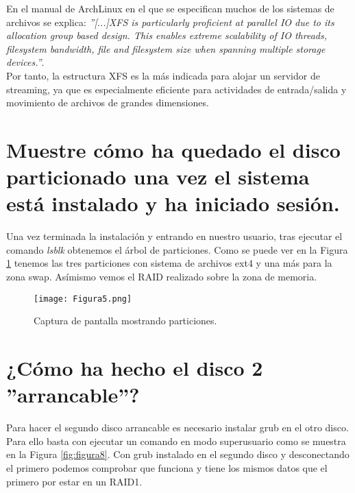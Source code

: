 En el manual de ArchLinux\cite{XFS} en el que se especifican muchos de los sistemas de archivos se explica: \textit{''[...]XFS is particularly proficient at parallel IO due to its allocation group based design. This enables extreme scalability of IO threads, filesystem bandwidth, file and filesystem size when spanning multiple storage devices.''}.\\
Por tanto, la estructura XFS es la más indicada para alojar un servidor de streaming\cite{streaming}, ya que es especialmente eficiente para actividades de entrada/salida y movimiento de archivos 
de grandes dimensiones.




\section{Muestre cómo ha quedado el disco particionado una vez el sistema está instalado y ha iniciado sesión.}

Una vez terminada la instalación y entrando en nuestro usuario, tras ejecutar el comando \textit{lsblk} obtenemos el árbol de particiones. Como se puede 
ver en la Figura \ref{fig:figura5} tenemos las tres particiones con sistema de archivos ext4 y una más para la zona swap. 
Asímismo vemos el RAID realizado sobre la zona de memoria.


\begin{figure}[H]
\centering
\texttt{[image: Figura5.png]} 
\caption{Captura de pantalla mostrando particiones.} \label{fig:figura5}
\end{figure}








\section{¿Cómo ha hecho el disco 2 ''arrancable''?}

Para hacer el segundo disco arrancable es necesario instalar grub en el otro disco. Para ello basta con ejecutar un comando en modo superusuario como se muestra en la 
Figura \ref{fig:figura8}. Con grub instalado en el segundo disco y desconectando el primero podemos comprobar que funciona y tiene los mismos datos que el primero por estar en
un RAID1.

